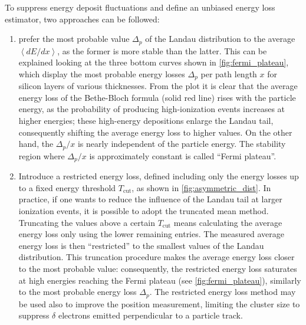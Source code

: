To suppress energy deposit fluctuations and define an unbiased energy loss estimator, two approaches can be followed:
\begin{enumerate}
	\item prefer the most probable value $\Delta_p$ of the Landau distribution to the average $\left\langle dE/dx \right\rangle$, as the former is more stable than the latter. This can be explained looking at the three bottom curves shown in \autoref{fig:fermi_plateau}, which display the most probable energy losses $\Delta_p$ per path length $x$ for silicon layers of various thicknesses. From the plot it is clear that the average energy loss of the Bethe-Bloch formula (solid red line) rises with the particle energy, as the probability of producing high-ionization events increases at higher energies; these high-energy depositions enlarge the Landau tail, consequently shifting the average energy loss to higher values. On the other hand, the $\Delta_p/x$ is nearly independent of the particle energy. The stability region where $\Delta_p/x$ is approximately constant is called ``Fermi plateau''.
	\item Introduce a restricted energy loss, defined including only the energy losses up to a fixed energy threshold $T_\text{cut}$, as shown in \autoref{fig:asymmetric_dist}. In practice, if one wants to reduce the influence of the Landau tail at larger ionization events, it is possible to adopt the truncated mean method. Truncating the values above a certain $T_\text{cut}$ means calculating the average energy loss only using the lower remaining entries. The measured average energy loss is then ``restricted'' to the smallest values of the Landau distribution. This truncation procedure makes the average energy loss closer to the most probable value: consequently, the restricted energy loss saturates at high energies reaching the Fermi plateau (see \autoref{fig:fermi_plateau}), similarly to the most probable energy loss $\Delta_p$. The restricted energy loss method may be used also to improve the position measurement, limiting the cluster size to suppress $\delta$ electrons emitted perpendicular to a particle track.
\end{enumerate}
